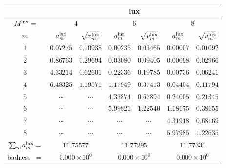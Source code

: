 \begin{tabular}{c|cc|cc|cc|}
&
\multicolumn{6}{|c|}{lux} \\
\hline
$M^{\mathrm{lux}}=$ &
 \multicolumn{2}{|c|}{$4$} &
 \multicolumn{2}{|c|}{$6$} &
 \multicolumn{2}{|c|}{$8$} \\
$m$ &
 $a^{\mathrm{lux}}_m$ & $\sqrt{v^{\mathrm{lux}}_m}$ &
 $a^{\mathrm{lux}}_m$ & $\sqrt{v^{\mathrm{lux}}_m}$ &
 $a^{\mathrm{lux}}_m$ & $\sqrt{v^{\mathrm{lux}}_m}$ \\
$1$ &
 $0.07275$ & $0.10938$ &
 $0.00235$ & $0.03465$ &
 $0.00007$ & $0.01092$ \\
$2$ &
 $0.86763$ & $0.29694$ &
 $0.03080$ & $0.09405$ &
 $0.00098$ & $0.02966$ \\
$3$ &
 $4.33214$ & $0.62601$ &
 $0.22336$ & $0.19785$ &
 $0.00736$ & $0.06241$ \\
$4$ &
 $6.48325$ & $1.19571$ &
 $1.17949$ & $0.37413$ &
 $0.04404$ & $0.11794$ \\
$5$ &
 $\cdots$ & $\cdots$ &
 $4.33874$ & $0.67894$ &
 $0.24005$ & $0.21345$ \\
$6$ &
 $\cdots$ & $\cdots$ &
 $5.99821$ & $1.22540$ &
 $1.18175$ & $0.38155$ \\
$7$ &
 $\cdots$ & $\cdots$ &
 $\cdots$ & $\cdots$ &
 $4.31918$ & $0.68169$ \\
$8$ &
 $\cdots$ & $\cdots$ &
 $\cdots$ & $\cdots$ &
 $5.97985$ & $1.22635$ \\
\hline
$\sum_m a^{\mathrm{lux}}_m=$ &
 \multicolumn{2}{|c|}{$11.75577$} &
 \multicolumn{2}{|c|}{$11.77295$} &
 \multicolumn{2}{|c|}{$11.77330$} \\
badness~$=$ &
 \multicolumn{2}{|c|}{$0.000\times 10^{0}$} &
 \multicolumn{2}{|c|}{$0.000\times 10^{0}$} &
 \multicolumn{2}{|c|}{$0.000\times 10^{0}$} \\
\end{tabular}
